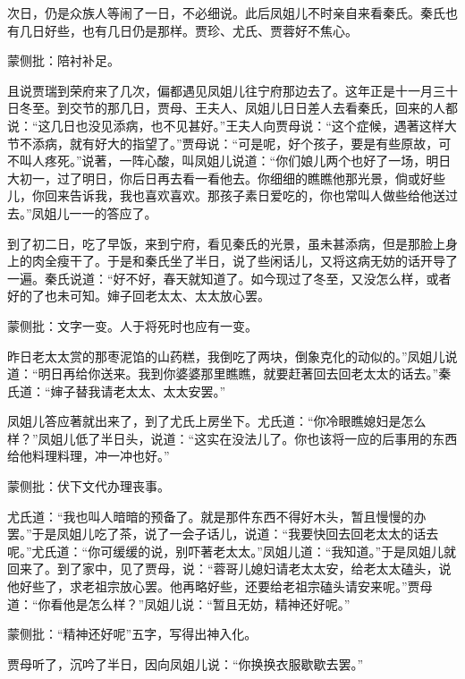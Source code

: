 \begin{parag}
    次日，仍是众族人等闹了一日，不必细说。此后凤姐儿不时亲自来看秦氏。秦氏也有几日好些，也有几日仍是那样。贾珍、尤氏、贾蓉好不焦心。\begin{note}蒙侧批：陪衬补足。\end{note}
\end{parag}


\begin{parag}
    且说贾瑞到荣府来了几次，偏都遇见凤姐儿往宁府那边去了。这年正是十一月三十日冬至。到交节的那几日，贾母、王夫人、凤姐儿日日差人去看秦氏，回来的人都说：“这几日也没见添病，也不见甚好。”王夫人向贾母说：“这个症候，遇著这样大节不添病，就有好大的指望了。”贾母说：“可是呢，好个孩子，要是有些原故，可不叫人疼死。”说著，一阵心酸，叫凤姐儿说道：“你们娘儿两个也好了一场，明日大初一，过了明日，你后日再去看一看他去。你细细的瞧瞧他那光景，倘或好些儿，你回来告诉我，我也喜欢喜欢。那孩子素日爱吃的，你也常叫人做些给他送过去。”凤姐儿一一的答应了。
\end{parag}


\begin{parag}
    到了初二日，吃了早饭，来到宁府，看见秦氏的光景，虽未甚添病，但是那脸上身上的肉全瘦干了。于是和秦氏坐了半日，说了些闲话儿，又将这病无妨的话开导了一遍。秦氏说道：“好不好，春天就知道了。如今现过了冬至，又没怎么样，或者好的了也未可知。婶子回老太太、太太放心罢。\begin{note}蒙侧批：文字一变。人于将死时也应有一变。\end{note}昨日老太太赏的那枣泥馅的山药糕，我倒吃了两块，倒象克化的动似的。”凤姐儿说道：“明日再给你送来。我到你婆婆那里瞧瞧，就要赶著回去回老太太的话去。”秦氏道：“婶子替我请老太太、太太安罢。”
\end{parag}


\begin{parag}
    凤姐儿答应著就出来了，到了尤氏上房坐下。尤氏道：“你冷眼瞧媳妇是怎么样？”凤姐儿低了半日头，说道：“这实在没法儿了。你也该将一应的后事用的东西给他料理料理，冲一冲也好。”\begin{note}蒙侧批：伏下文代办理丧事。\end{note}尤氏道：“我也叫人暗暗的预备了。就是那件东西不得好木头，暂且慢慢的办罢。”于是凤姐儿吃了茶，说了一会子话儿，说道：“我要快回去回老太太的话去呢。”尤氏道：“你可缓缓的说，别吓著老太太。”凤姐儿道：“我知道。”于是凤姐儿就回来了。到了家中，见了贾母，说：“蓉哥儿媳妇请老太太安，给老太太磕头，说他好些了，求老祖宗放心罢。他再略好些，还要给老祖宗磕头请安来呢。”贾母道：“你看他是怎么样？”凤姐儿说：“暂且无妨，精神还好呢。”\begin{note}蒙侧批：“精神还好呢”五字，写得出神入化。\end{note}贾母听了，沉吟了半日，因向凤姐儿说：“你换换衣服歇歇去罢。”
\end{parag}


